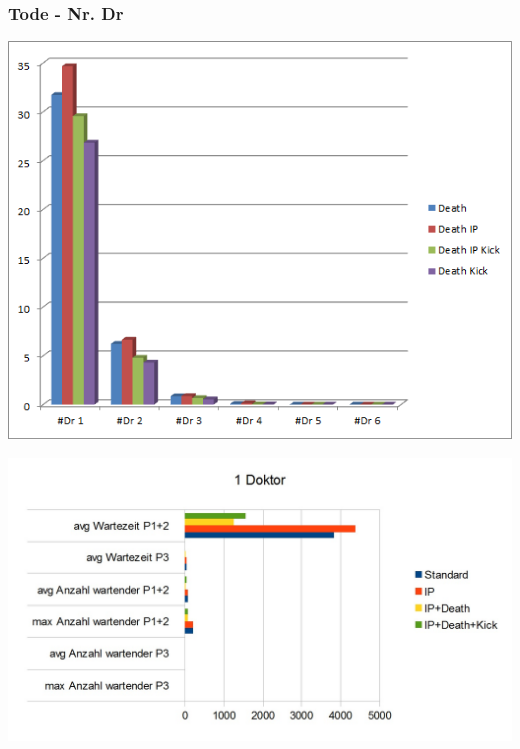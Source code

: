 \documentclass{beamer}
\begin{document}
\begin{frame}
	\frametitle{Tode - Nr. Dr}
	\begin{center}
		\includegraphics[scale=0.65]{img/DeathsNrDr.png}
	\end{center}
\end{frame}


\begin{frame}
	\includegraphics[scale=0.4]{img/1Doktor.jpg}
\end{frame}
\end{document}
